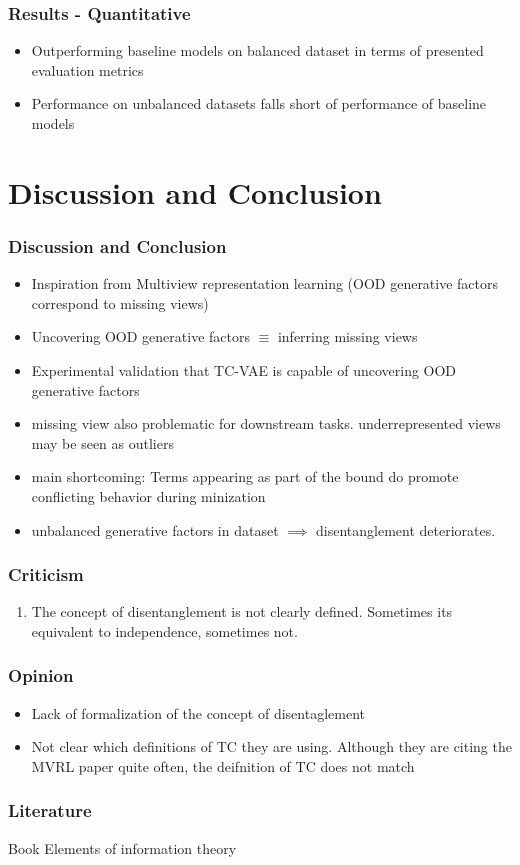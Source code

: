 \documentclass{beamer}
\theoremstyle{definition}
\begin{document}
    \begin{frame}
      \frametitle{Results - Quantitative}
      \begin{itemize}
        \item Outperforming baseline models on balanced dataset in terms of presented evaluation metrics

        \item Performance on unbalanced datasets falls short of performance of baseline models
      \end{itemize}
    \end{frame}

  \section{Discussion and Conclusion}
    \begin{frame}
      \frametitle{Discussion and Conclusion}
      \begin{itemize}
        \item Inspiration from Multiview representation learning (OOD generative factors correspond to missing views)
        \item Uncovering OOD generative factors $\equiv$ inferring missing views
        \item Experimental validation that TC-VAE is capable of uncovering OOD generative factors
        \item missing view also problematic for downstream tasks. underrepresented views may be seen as outliers
        \item main shortcoming: Terms appearing as part of the bound do promote conflicting behavior during minization
        \item unbalanced generative factors in dataset $\implies$ disentanglement deteriorates.
      \end{itemize}
    \end{frame}


    \begin{frame}
      \frametitle{Criticism}
      \begin{enumerate}
              \item The concept of disentanglement is not clearly defined. Sometimes its equivalent to independence, sometimes not.
      \end{enumerate}
    \end{frame}


    \begin{frame}
      \frametitle{Opinion}
      \begin{itemize}
        \item Lack of formalization of the concept of disentaglement
        \item Not clear which definitions of TC they are using. Although they are citing the MVRL paper quite often, the deifnition of TC does not match



      \end{itemize}

    \end{frame}


    \begin{frame}
      \frametitle{Literature}
      Book Elements of information theory
    \end{frame}


   
\end{document}
